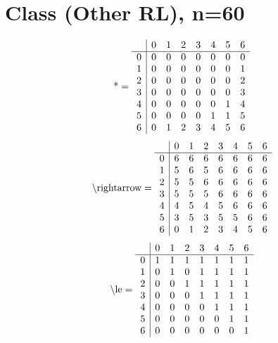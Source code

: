 \documentclass[11pt]{article}
\begin{document}
\section{Class (Other RL), n=60}
\[\text{*} = 
\begin{array}{r | r r r r r r r}
 & 0 & 1 & 2 & 3 & 4 & 5 & 6 \\ \hline
0 & 0 & 0 & 0 & 0 & 0 & 0 & 0 \\
1 & 0 & 0 & 0 & 0 & 0 & 0 & 1 \\
2 & 0 & 0 & 0 & 0 & 0 & 0 & 2 \\
3 & 0 & 0 & 0 & 0 & 0 & 0 & 3 \\
4 & 0 & 0 & 0 & 0 & 0 & 1 & 4 \\
5 & 0 & 0 & 0 & 0 & 1 & 1 & 5 \\
6 & 0 & 1 & 2 & 3 & 4 & 5 & 6 \\
\end{array}
\]
\[\text{\textbackslash rightarrow} = 
\begin{array}{r | r r r r r r r}
 & 0 & 1 & 2 & 3 & 4 & 5 & 6 \\ \hline
0 & 6 & 6 & 6 & 6 & 6 & 6 & 6 \\
1 & 5 & 6 & 5 & 6 & 6 & 6 & 6 \\
2 & 5 & 5 & 6 & 6 & 6 & 6 & 6 \\
3 & 5 & 5 & 5 & 6 & 6 & 6 & 6 \\
4 & 4 & 5 & 4 & 5 & 6 & 6 & 6 \\
5 & 3 & 5 & 3 & 5 & 5 & 6 & 6 \\
6 & 0 & 1 & 2 & 3 & 4 & 5 & 6 \\
\end{array}
\]
\[\text{\textbackslash le} = 
\begin{array}{r | r r r r r r r}
 & 0 & 1 & 2 & 3 & 4 & 5 & 6 \\ \hline
0 & 1 & 1 & 1 & 1 & 1 & 1 & 1 \\
1 & 0 & 1 & 0 & 1 & 1 & 1 & 1 \\
2 & 0 & 0 & 1 & 1 & 1 & 1 & 1 \\
3 & 0 & 0 & 0 & 1 & 1 & 1 & 1 \\
4 & 0 & 0 & 0 & 0 & 1 & 1 & 1 \\
5 & 0 & 0 & 0 & 0 & 0 & 1 & 1 \\
6 & 0 & 0 & 0 & 0 & 0 & 0 & 1 \\
\end{array}
\]
\end{document}
